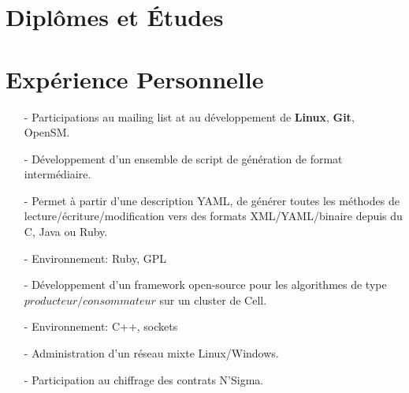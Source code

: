 \documentclass[10pt,a4paper]{moderncv}
\begin{document}
\section{Diplômes et Études}

\section{Expérience Personnelle}
{
\begin{itemize}
\item[-]{Participations au mailing list at au développement de \textbf{Linux}, \textbf{Git}, OpenSM.}
\end{itemize}
}

{
\begin{itemize}
\item[-]{Développement d'un ensemble de script de génération de format intermédiaire.}
\item[-]{Permet à partir d'une description YAML, de générer toutes les méthodes de lecture/écriture/modification vers des formats XML/YAML/binaire depuis du C, Java ou Ruby.}
\item[-]{Environnement: Ruby, GPL}
\end{itemize}
}
{
\begin{itemize}
\item[-]{Développement d'un framework open-source pour les algorithmes de type $producteur/consommateur$ sur un cluster de Cell.}
\item[-]{Environnement: C++, sockets}
\end{itemize}
}
{
\begin{itemize}
\item[-]{Administration d'un réseau mixte Linux/Windows.}
\item[-]{Participation au chiffrage des contrats N'Sigma.}
\end{itemize}
}
\end{document}
